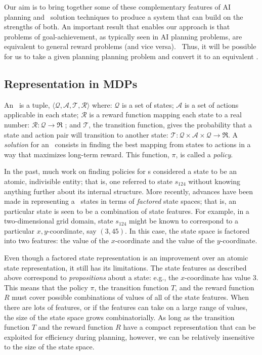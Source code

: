 Our aim is to bring together some of these complementary features of
AI planning and \mdp\ solution techniques to produce a system that can
build on the strengths of both.  An important result that enables our
approach is that problems of goal-achievement, as typically seen in AI
planning problems, are equivalent to general reward problems (and vice
versa).~\cite{majercik03} Thus, it will be possible for us to take a
given planning planning problem and convert it to an equivalent \mdp.

 
\subsection{Representation in MDPs}

An \mdp\ is a tuple, $\langle
\mathcal{Q,A,T,R}\rangle$ where: $\mathcal{Q}$ is a set of states;
$\mathcal{A}$ is a set of
actions applicable in each state; $\mathcal{R}$ is a reward function mapping each state to a real number: 
$\mathcal{R}: \mathcal{Q} \rightarrow \Re $  ;
and $\mathcal{T}$, the transition function, gives the probability that a state and action pair will transition to another state: 
$\mathcal{T}: \mathcal{Q} \times \mathcal{A} \times \mathcal{Q} \rightarrow \Re $.  
A \emph{solution} for an \mdp\ consists in finding
the best mapping from states to actions in a way that
maximizes long-term reward. This function, $\pi$, is called a \emph{policy}.


In the past, much  work on finding policies for \mdp s considered
a state to be an atomic, indivisible entity; that is, one referred to
state $s_{124}$ without knowing anything further about its internal
structure.   More recently, advances have been made in representing a
\mdp\ states in terms of \emph{factored} state spaces; that is, an
particular state is seen to be a combination of state features.  For
example, in a two-dimensional grid domain, state $s_{124}$ might be known to
correspond to a particular $x,y$-coordinate, say $(3,45)$.  In this
case, the state space is factored into two features:
the value of the $x$-coordinate and the value of the $y$-coordinate.

Even though a factored state representation is an improvement over an
atomic state representation, it still has its limitations. The state
features as described above correspond to \emph{propositions} about a
state: e.g., the $x$-coordinate has value 3.  This means that the
policy $\pi$, the transition function $T$, and the reward function $R$
must cover possible
combinations of values of all of the state features.  When there are
lots of features, or if the features can take on a large range
of values, the size of the state space grows combinatorially.  As long as the transition function $T$ and the reward function $R$ have a compact representation that can be exploited for efficiency during planning, however, we can be relatively insensitive to the size of the state space. 

